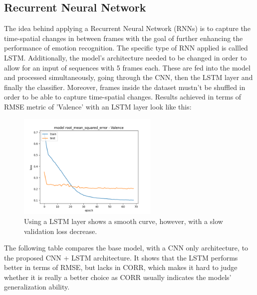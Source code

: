 \subsection{Recurrent Neural Network}

The idea behind applying a Recurrent Neural Network (RNNs) is to capture the time-spatial changes in between frames with the goal of further enhancing the performance of emotion recognition. The specific type of RNN applied is callled LSTM. Additionally, the model's architecture needed to be changed in order to allow for an input of sequences with 5 frames each. These are fed into the model and processed simultaneously, going through the CNN, then the LSTM layer and finally the classifier. Moreover, frames inside the dataset mustn't be shuffled in order to be able to capture time-spatial changes.
\newline\newline
Results achieved in terms of RMSE metric of 'Valence' with an LSTM layer look like this:

\begin{figure}[H]
  \begin{center}
  \includegraphics[angle=0, width=0.6\textwidth]{Figures/rmse_out_LSTM.png}
  \caption{Using a LSTM layer shows a smooth curve, however, with a slow validation loss decrease.}
  \label{fig:AblationLSTM}
  \end{center}
\end{figure}

The following table compares the base model, with a CNN only architecture, to the proposed CNN + LSTM architecture. It shows that the LSTM performs better in terms of RMSE, but lacks in CORR, which makes it hard to judge whether it is really a better choice as CORR usually indicates the models' generalization ability. 

